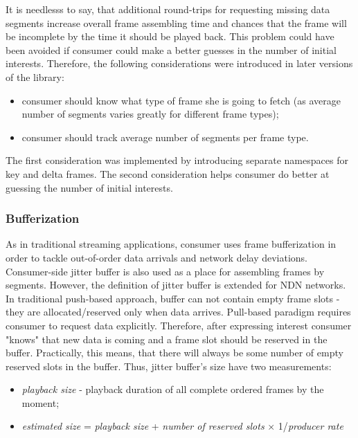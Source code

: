 \documentclass[10pt]{proc}
\begin{document}
It is needlesss to say, that additional round-trips for requesting missing data segments increase overall frame assembling time and chances that the frame will be incomplete by the time it should be played back. This problem could have been avoided if consumer could make a better guesses in the number of initial interests. Therefore, the following considerations were introduced in later versions of the library:
\begin{itemize}
\item consumer should know what type of frame she is going to fetch (as average number of segments varies greatly for different frame types);
\item consumer should track average number of segments per frame type.
\end{itemize}

The first consideration was implemented by introducing separate namespaces for key and delta frames. The second consideration helps consumer do better at guessing the number of initial interests.

\subsubsection{Bufferization}


As in traditional streaming applications, consumer uses frame bufferization in order to tackle out-of-order data arrivals and network delay deviations. Consumer-side jitter buffer is also used as a place for assembling frames by segments. However, the definition of jitter buffer is extended for NDN networks. In traditional push-based approach, buffer can not contain empty frame slots - they are allocated/reserved only when data arrives. Pull-based paradigm requires consumer to request data explicitly. Therefore, after expressing interest consumer "knows" that new data is coming and a frame slot should be reserved in the buffer. Practically, this means, that there will always be some number of empty reserved slots in the buffer. Thus, jitter buffer's size have two measurements:
\begin{itemize} 
\item \textit{playback size} - playback duration of all complete ordered frames by the moment;
\item \textit{estimated size} = \textit{playback size} + \textit{number of reserved slots} $\times$ 1/\textit{producer rate}
\end{itemize}
\end{document}
